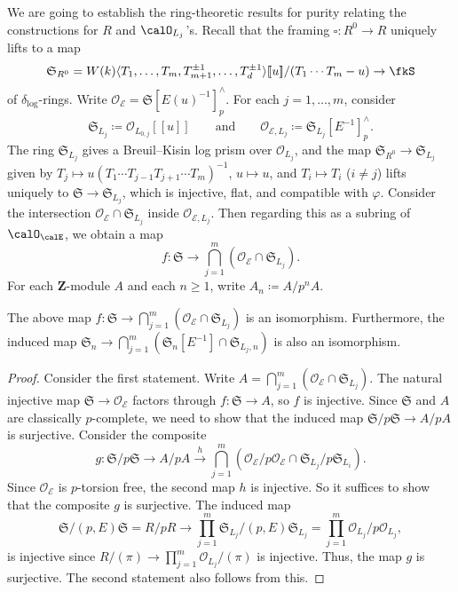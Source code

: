 We are going to establish the ring-theoretic results for purity relating the constructions for $R$ and $\calO_{L_j}$'s.
Recall that the framing $\square\colon R^0 \to R$ uniquely lifts to a map 
\[
\mathfrak{S}_{R^{0}} = W(k)\langle T_1, \ldots, T_m, T_{m+1}^{\pm 1}, \ldots, T_d^{\pm 1}\rangle[\![u]\!] / (T_1\cdots T_m-u)\rightarrow \fkS
\] 
of $\delta_\log$-rings. Write $\mathcal{O}_{\mathcal{E}} = \mathfrak{S}[E(u)^{-1}]^{\wedge}_p$. For each $j = 1, \ldots, m$, consider 
\[
\mathfrak{S}_{L_j} \coloneqq \mathcal{O}_{L_{0, j}}[\![u]\!]\qquad\text{and}\qquad \mathcal{O}_{\mathcal{E}, L_j} \coloneqq \mathfrak{S}_{L_j}[E^{-1}]^{\wedge}_p.
\]
The ring $\mathfrak{S}_{L_j}$ gives a Breuil--Kisin log prism over $\mathcal{O}_{L_j}$, and the map $\mathfrak{S}_{R^{0}} \rightarrow \mathfrak{S}_{L_j}$ given by $T_j \mapsto u(T_1\cdots T_{j-1}T_{j+1}\cdots T_m)^{-1}$, $u \mapsto u$, and $T_i \mapsto T_i$ ($i \neq j$) lifts uniquely to $\mathfrak{S} \rightarrow \mathfrak{S}_{L_j}$, which is injective, flat, and compatible with $\varphi$. Consider the intersection $\mathcal{O}_{\mathcal{E}} \cap \mathfrak{S}_{L_j}$ inside $\mathcal{O}_{\mathcal{E}, L_j}$.  Then regarding this as a subring of $\calO_\calE$, we obtain a map
\[
f\colon \mathfrak{S} \rightarrow \bigcap_{j = 1}^m (\mathcal{O}_{\mathcal{E}} \cap \mathfrak{S}_{L_j}).
\]
For each $\mathbf{Z}$-module $A$ and each $n \geq 1$, write $A_n \coloneqq A/p^n A$.

\begin{lem} \label{lem:intersection-basic-rings}
The above map $f\colon \mathfrak{S} \rightarrow \bigcap_{j=1}^m (\mathcal{O}_{\mathcal{E}} \cap \mathfrak{S}_{L_j})$ is an isomorphism. Furthermore, the induced map $\mathfrak{S}_n \rightarrow \bigcap_{j=1}^m (\mathfrak{S}_n[E^{-1}] \cap \mathfrak{S}_{L_j, n})$ is also an isomorphism. 
\end{lem}

\begin{proof}
Consider the first statement. Write $A = \bigcap_{j=1}^m (\mathcal{O}_{\mathcal{E}} \cap \mathfrak{S}_{L_j})$. The natural injective map $\mathfrak{S} \rightarrow \mathcal{O}_{\mathcal{E}}$ factors through $f\colon \mathfrak{S} \rightarrow A$, so $f$ is injective. Since $\mathfrak{S}$ and $A$ are classically $p$-complete, we need to show that the induced map $\mathfrak{S}/p\mathfrak{S} \rightarrow A/pA$ is surjective. 
Consider the composite
\[
g\colon \mathfrak{S}/p\mathfrak{S} \longrightarrow A/pA \stackrel{h}{\longrightarrow} \bigcap_{j=1}^m (\mathcal{O}_{\mathcal{E}}/p\mathcal{O}_{\mathcal{E}} \cap \mathfrak{S}_{L_j}/p\mathfrak{S}_{L_i}).
\]
Since $\mathcal{O}_{\mathcal{E}}$ is $p$-torsion free, the second map $h$ is injective. So it suffices to show that the composite $g$ is surjective. The induced map
\[
\mathfrak{S}/(p, E)\mathfrak{S} = R/pR \rightarrow \prod_{j=1}^m \mathfrak{S}_{L_j}/(p, E)\mathfrak{S}_{L_j} = \prod_{j=1}^m \mathcal{O}_{L_j}/p\mathcal{O}_{L_j},
\]
is injective since $R/(\pi) \rightarrow \prod_{j=1}^m \mathcal{O}_{L_j}/(\pi)$ is injective. Thus, the map $g$ is surjective. The second statement also follows from this.
\end{proof}

